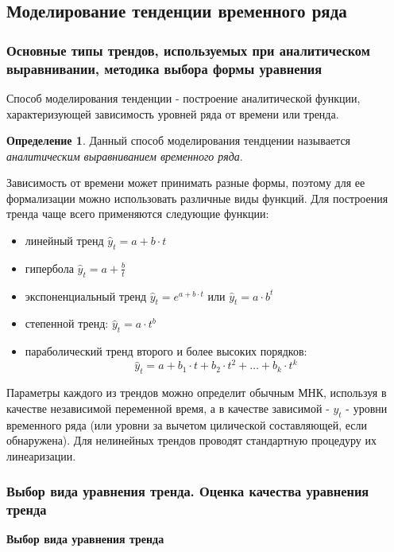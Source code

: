 \documentclass[aps,%
12pt,%
final,%
oneside,
onecolumn,%
musixtex, %
superscriptaddress,%
centertags]{article} %
\theoremstyle{plain}
\theoremstyle{definition}
\newtheorem{definition}{Определение}[subsection]
\theoremstyle{remark}
\begin{document}
\newpage
\subsection{Моделирование тенденции временного ряда}

\subsubsection{Основные типы трендов, используемых при аналитическом выравнивании, методика выбора формы уравнения}

Способ моделирования тенденции - построение аналитической функции, характеризующей зависимость уровней ряда от времени или тренда.

\begin{definition}
	Данный способ моделирования тендцении называется \textit{аналитическим выравниванием временного ряда}.
\end{definition}

Зависимость от времени может принимать разные формы, поэтому для ее формализации можно использовать различные виды функций. Для построения тренда чаще всего применяются следующие функции:

\begin{itemize}
	\item линейный тренд $\hat{y}_t = a + b\cdot t$
	\item гипербола $\hat{y}_t = a + \frac{b}{t}$
	\item экспоненциальный тренд $\hat{y}_t = e^{a+b\cdot t}$ или $\hat{y}_t = a \cdot b^t$
	\item степенной тренд: $\hat{y}_t = a \cdot t^b$
	\item параболический тренд второго и более высоких порядков:
	$$\hat{y}_t = a + b_1 \cdot t + b_2 \cdot t^2 + \ldots + b_k \cdot t^k$$
\end{itemize}

Параметры каждого из трендов можно определит обычным МНК, используя в качестве независимой переменной время, а в качестве зависимой - $y_t$ - уровни временного ряда (или уровни за вычетом цилической составляющей, если обнаружена). Для нелинейных трендов проводят стандартную процедуру их линеаризации.

\subsubsection{Выбор вида уравнения тренда. Оценка качества уравнения тренда}

\textbf{Выбор вида уравнения тренда}
\end{document}
